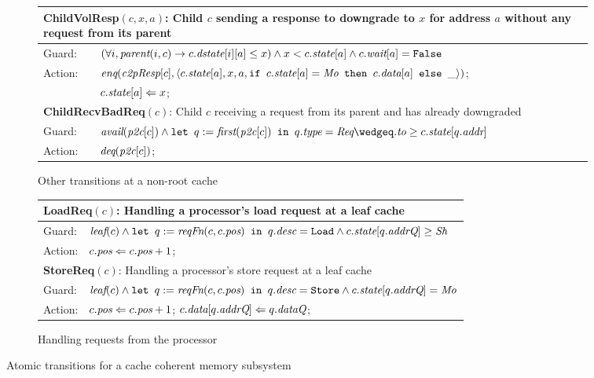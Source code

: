 \begin{figure}
\begin{subfigure}{\textwidth}
\centering
\begin{tabular}{|ll|}
\hline
\multicolumn{2}{|p{\textwidth}|}{\textbf{ChildVolResp}$(c, x, a)$: Child $c$ sending a response to downgrade to $x$ for address $a$ without any request from its parent}\\
\hline
Guard: & $(\forall i, \textit{parent}(i, c) \rightarrow c.\textit{dstate}[i][a] \le x) \wedge x < c.\textit{state}[a] \wedge c.\textit{wait}[a] = \texttt{False}$\\
\hline
Action: & $\enq(\cpResp[c], \langle c.\state[a], x, a,%
\myif c.\state[a] = \Mo \mythen c.\data[a] \myelse \_\rangle)$;\\
& $c.\textit{state}[a] \Leftarrow x$;\\
\hline
\hline
\multicolumn{2}{|p{\textwidth}|}{\textbf{ChildRecvBadReq}$(c)$: Child $c$ receiving a request from its parent and has already downgraded}\\
\hline
Guard: & 
$\avail(\pc[c]) \wedge \mylet q := \first(\pc[c]) \myin q.\typ = \Req \wedge%
q.\myto \ge c.\state[q.\addr]$\\
\hline
Action: & $\textit{deq}(\textit{p2c}[c])$;\\
\hline
\end{tabular}
\caption{Other transitions at a non-root cache}
\label{childextra}
\end{subfigure}

\begin{subfigure}{\textwidth}
\centering
\begin{tabular}{|ll|}
\hline
\multicolumn{2}{|l|}{\textbf{LoadReq}$(c)$: Handling a processor's load request at a leaf cache}\\
\hline
Guard: & $\textit{leaf}(c) \wedge \texttt{let } q := \textit{reqFn}(c, c.\textit{pos}) \texttt{ in } q.\textit{desc} = \texttt{Load} \wedge c.\textit{state}[q.\textit{addrQ}] \ge \textit{Sh}$\\
\hline
Action:& $c.\textit{pos} \Leftarrow c.\textit{pos} + 1$;\\
\hline
\hline
\multicolumn{2}{|l|}{\textbf{StoreReq}$(c)$: Handling a processor's store request at a leaf cache}\\
\hline
Guard: & $\textit{leaf}(c) \wedge \texttt{let } q := \textit{reqFn}(c, c.\textit{pos}) \texttt{ in } q.\textit{desc} = \texttt{Store} \wedge c.\textit{state}[q.\textit{addrQ}] = \textit{Mo}$\\
\hline
\hline
Action:& $c.\textit{pos} \Leftarrow c.\textit{pos} + 1$; $c.\textit{data}[q.\textit{addrQ}] \Leftarrow q.\textit{dataQ}$;\\
\hline
\end{tabular}
\caption{Handling requests from the processor}
\label{procside}
\end{subfigure}
\caption{Atomic transitions for a cache coherent memory subsystem}
\label{trans}
\end{figure}

